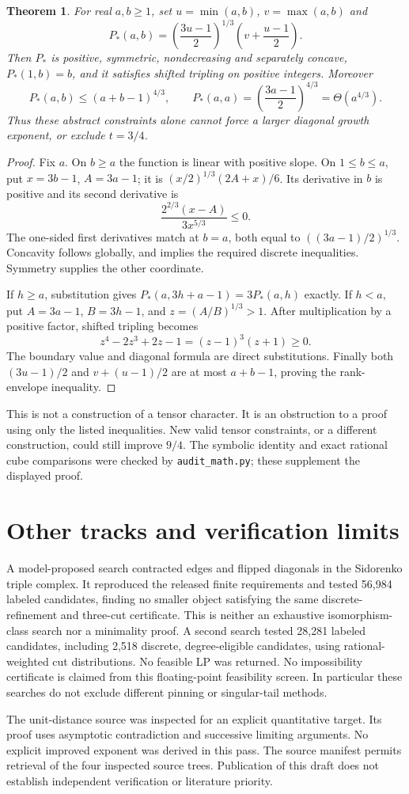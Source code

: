\documentclass[11pt]{article}
\newtheorem{theorem}{Theorem}
\begin{document}
\begin{theorem}\label{thm:barrier}
For real $a,b\ge1$, set $u=\min(a,b)$, $v=\max(a,b)$ and
\[
 P_*(a,b)=\left(\frac{3u-1}{2}\right)^{1/3}
                      \left(v+\frac{u-1}{2}\right).
\]
Then $P_*$ is positive, symmetric, nondecreasing and separately concave,
$P_*(1,b)=b$, and it satisfies shifted tripling on positive integers.
Moreover
\[
 P_*(a,b)\le(a+b-1)^{4/3},\qquad
 P_*(a,a)=\left(\frac{3a-1}{2}\right)^{4/3}=\Theta(a^{4/3}).
\]
Thus these abstract constraints alone cannot force a larger diagonal
growth exponent, or exclude $t=3/4$.
\end{theorem}
\begin{proof}
Fix $a$. On $b\ge a$ the function is linear with positive slope.
On $1\le b\le a$, put $x=3b-1$, $A=3a-1$; it is
$(x/2)^{1/3}(2A+x)/6$. Its derivative in $b$ is positive and its
second derivative is
\[
 \frac{2^{2/3}(x-A)}{3x^{5/3}}\le0.
\]
The one-sided first derivatives match at $b=a$, both equal to
$((3a-1)/2)^{1/3}$. Concavity follows globally, and implies the required
discrete inequalities. Symmetry supplies the other coordinate.

If $h\ge a$, substitution gives
$P_*(a,3h+a-1)=3P_*(a,h)$ exactly. If $h<a$, put
$A=3a-1$, $B=3h-1$, and $z=(A/B)^{1/3}>1$.
After multiplication by a positive factor, shifted tripling becomes
\[
 z^4-2z^3+2z-1=(z-1)^3(z+1)\ge0.
\]
The boundary value and diagonal formula are direct substitutions.
Finally both $(3u-1)/2$ and $v+(u-1)/2$ are at most $a+b-1$,
proving the rank-envelope inequality.
\end{proof}
This is not a construction of a tensor character. It is an obstruction
to a proof using only the listed inequalities. New valid tensor
constraints, or a different construction, could still improve $9/4$.
The symbolic identity and exact rational cube comparisons were checked
by \texttt{audit\_math.py}; these supplement the displayed proof.

\section{Other tracks and verification limits}
A model-proposed search contracted edges and flipped diagonals in the
Sidorenko triple complex. It reproduced the released finite requirements
and tested 56,984 labeled candidates, finding no smaller object satisfying
the same discrete-refinement and three-cut certificate. This is neither
an exhaustive isomorphism-class search nor a minimality proof. A second
search tested 28,281 labeled candidates, including 2,518 discrete,
degree-eligible candidates, using rational-weighted cut distributions.
No feasible LP was returned. No impossibility certificate is claimed
from this floating-point feasibility screen. In particular these searches
do not exclude different pinning or singular-tail methods.

The unit-distance source was inspected for an explicit quantitative
target. Its proof uses asymptotic contradiction and successive limiting
arguments. No explicit improved exponent was derived in this pass.
The source manifest permits retrieval of the four inspected source trees.
Publication of this draft does not establish independent verification or
literature priority.
\end{document}
